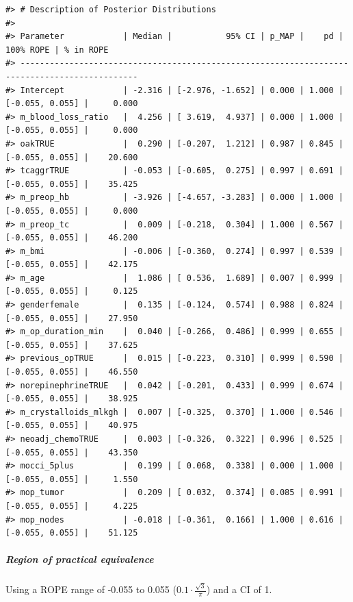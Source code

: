 \documentclass[
]{article}
\begin{document}
\begin{verbatim}
#> # Description of Posterior Distributions
#> 
#> Parameter            | Median |           95% CI | p_MAP |    pd |       100% ROPE | % in ROPE
#> ----------------------------------------------------------------------------------------------
#> Intercept            | -2.316 | [-2.976, -1.652] | 0.000 | 1.000 | [-0.055, 0.055] |     0.000
#> m_blood_loss_ratio   |  4.256 | [ 3.619,  4.937] | 0.000 | 1.000 | [-0.055, 0.055] |     0.000
#> oakTRUE              |  0.290 | [-0.207,  1.212] | 0.987 | 0.845 | [-0.055, 0.055] |    20.600
#> tcaggrTRUE           | -0.053 | [-0.605,  0.275] | 0.997 | 0.691 | [-0.055, 0.055] |    35.425
#> m_preop_hb           | -3.926 | [-4.657, -3.283] | 0.000 | 1.000 | [-0.055, 0.055] |     0.000
#> m_preop_tc           |  0.009 | [-0.218,  0.304] | 1.000 | 0.567 | [-0.055, 0.055] |    46.200
#> m_bmi                | -0.006 | [-0.360,  0.274] | 0.997 | 0.539 | [-0.055, 0.055] |    42.175
#> m_age                |  1.086 | [ 0.536,  1.689] | 0.007 | 0.999 | [-0.055, 0.055] |     0.125
#> genderfemale         |  0.135 | [-0.124,  0.574] | 0.988 | 0.824 | [-0.055, 0.055] |    27.950
#> m_op_duration_min    |  0.040 | [-0.266,  0.486] | 0.999 | 0.655 | [-0.055, 0.055] |    37.625
#> previous_opTRUE      |  0.015 | [-0.223,  0.310] | 0.999 | 0.590 | [-0.055, 0.055] |    46.550
#> norepinephrineTRUE   |  0.042 | [-0.201,  0.433] | 0.999 | 0.674 | [-0.055, 0.055] |    38.925
#> m_crystalloids_mlkgh |  0.007 | [-0.325,  0.370] | 1.000 | 0.546 | [-0.055, 0.055] |    40.975
#> neoadj_chemoTRUE     |  0.003 | [-0.326,  0.322] | 0.996 | 0.525 | [-0.055, 0.055] |    43.350
#> mocci_5plus          |  0.199 | [ 0.068,  0.338] | 0.000 | 1.000 | [-0.055, 0.055] |     1.550
#> mop_tumor            |  0.209 | [ 0.032,  0.374] | 0.085 | 0.991 | [-0.055, 0.055] |     4.225
#> mop_nodes            | -0.018 | [-0.361,  0.166] | 1.000 | 0.616 | [-0.055, 0.055] |    51.125
\end{verbatim}

\hypertarget{region-of-practical-equivalence}{%
\subparagraph{Region of practical equivalence}\label{region-of-practical-equivalence}}

Using a ROPE range of -0.055 to 0.055 (\(0.1 \cdot \frac{\sqrt{3}}{\pi}\)) and a CI of 1.
\end{document}
